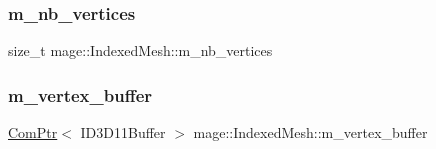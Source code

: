\subsubsection{\texorpdfstring{m\+\_\+nb\+\_\+vertices}{m\_nb\_vertices}}
{\footnotesize\ttfamily size\+\_\+t mage\+::\+Indexed\+Mesh\+::m\+\_\+nb\+\_\+vertices\hspace{0.3cm}{\ttfamily [protected]}}

\hypertarget{classmage_1_1_indexed_mesh_a306c078e64be74e67ca302ac816899cd}{}\label{classmage_1_1_indexed_mesh_a306c078e64be74e67ca302ac816899cd} 
\subsubsection{\texorpdfstring{m\+\_\+vertex\+\_\+buffer}{m\_vertex\_buffer}}
{\footnotesize\ttfamily \hyperlink{namespacemage_ae74f374780900893caa5555d1031fd79}{Com\+Ptr}$<$ I\+D3\+D11\+Buffer $>$ mage\+::\+Indexed\+Mesh\+::m\+\_\+vertex\+\_\+buffer\hspace{0.3cm}{\ttfamily [protected]}}

